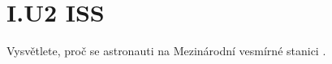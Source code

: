 \documentclass[crop=false]{standalone}
\begin{document}
\section*{I.U2 ISS}
Vysvětlete, proč se astronauti na Mezinárodní vesmírné stanici .
\end{document}
